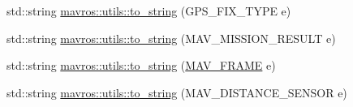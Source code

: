 \begin{DoxyCompactItemize}
\item 
std\+::string \mbox{\hyperlink{group__nodelib_gacb77da537287a4ebf732b8b04832466e}{mavros\+::utils\+::to\+\_\+string}} (G\+P\+S\+\_\+\+F\+I\+X\+\_\+\+T\+Y\+PE e)
\item 
std\+::string \mbox{\hyperlink{group__nodelib_ga239f977f7399f313bdb3bdb5b10d5e82}{mavros\+::utils\+::to\+\_\+string}} (M\+A\+V\+\_\+\+M\+I\+S\+S\+I\+O\+N\+\_\+\+R\+E\+S\+U\+LT e)
\item 
std\+::string \mbox{\hyperlink{group__nodelib_gab4f14da7e17442ff8985ce2789c9a298}{mavros\+::utils\+::to\+\_\+string}} (\mbox{\hyperlink{include__v0_89_2mavlink__types_8h_aae9266d97d838a375605b69000c60617}{M\+A\+V\+\_\+\+F\+R\+A\+ME}} e)
\item 
std\+::string \mbox{\hyperlink{group__nodelib_gaaea3adb4b5c17eaa45a8088779b1a8fc}{mavros\+::utils\+::to\+\_\+string}} (M\+A\+V\+\_\+\+D\+I\+S\+T\+A\+N\+C\+E\+\_\+\+S\+E\+N\+S\+OR e)
\end{DoxyCompactItemize}
